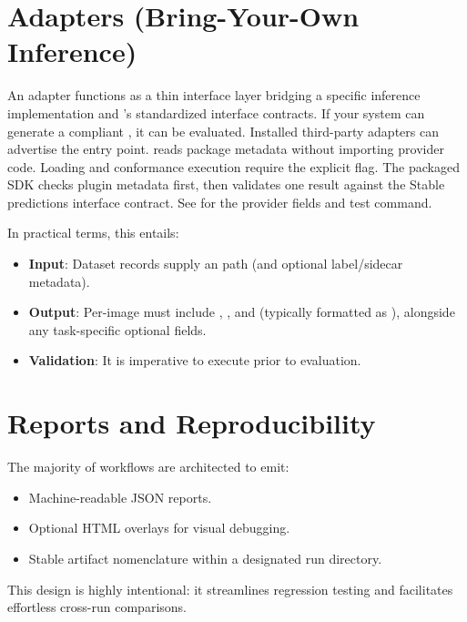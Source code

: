 \section{Adapters (Bring-Your-Own Inference)}
An adapter functions as a thin interface layer bridging a specific inference implementation and \yolozu{}'s standardized interface contracts. If your system can generate a compliant , it can be evaluated.
Installed third-party adapters can advertise the
 entry point.  reads package
metadata without importing provider code. Loading and conformance execution
require the explicit  flag. The packaged SDK checks
plugin metadata first, then validates one  result against
the Stable predictions interface contract. See
 for the provider fields and test command.

In practical terms, this entails:
\begin{itemize}
  \item \textbf{Input}: Dataset records supply an  path (and optional label/sidecar metadata).
  \item \textbf{Output}: Per-image  must include , , and  (typically formatted as ), alongside any task-specific optional fields.
  \item \textbf{Validation}: It is imperative to execute  prior to evaluation.
\end{itemize}

\section{Reports and Reproducibility}
The majority of workflows are architected to emit:
\begin{itemize}
  \item Machine-readable JSON reports.
  \item Optional HTML overlays for visual debugging.
  \item Stable artifact nomenclature within a designated run directory.
\end{itemize}

This design is highly intentional: it streamlines regression testing and facilitates effortless cross-run comparisons.
